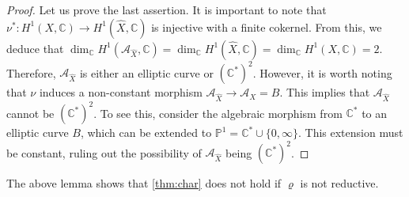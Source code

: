 \documentclass[11pt,english]{smfart}
\theoremstyle{plain}
\theoremstyle{definition}
\theoremstyle{remark}
\numberwithin{equation}{subsection}
\theoremstyle{plain}
\newcommand{\cA}{\mathcal A}
\newcommand{\bC}{\mathbb{C}}
\begin{document}
\begin{proof}
Let us prove the last assertion. It is important to note that $\nu^*: H^1(X, \mathbb{C}) \to H^1(\widehat{X}, \mathbb{C})$ is   injective with a finite cokernel. From this, we deduce that $\dim_\bC H^1(\cA_{\widehat{X}},\bC)=\dim_\bC H^1(\widehat{X},\bC)=\dim_\bC H^1({X},\bC)=2$.  Therefore, $ \cA_{\widehat{X}}$ is   either an elliptic curve or $(\bC^*)^2$.  However, it is worth noting that $\nu$ induces a non-constant morphism $\cA_{\widehat{X}} \to \cA_X=B$. This implies that $\cA_{\widehat{X}}$ cannot be $(\mathbb{C}^*)^2$. To see this, consider the algebraic morphism from $\mathbb{C}^*$ to an elliptic curve $B$, which can be extended to $\mathbb{P}^1 = \mathbb{C}^* \cup \{0,\infty\}$. This extension must be constant, ruling out the possibility of $\cA_{\widehat{X}}$ being $(\mathbb{C}^*)^2$.
\end{proof}
The above lemma shows that \cref{thm:char} does not hold if $\varrho$ is not reductive. 
\end{document}
